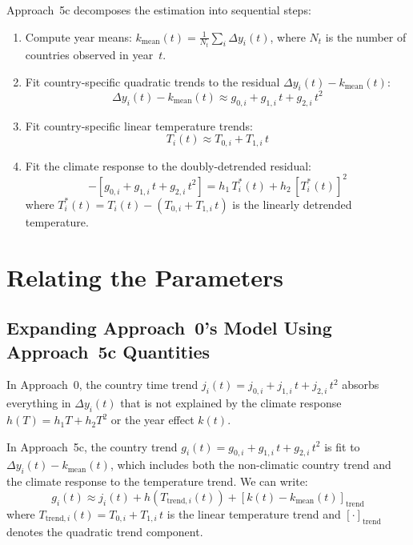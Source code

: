 \documentclass[11pt]{article}
\begin{document}
Approach~5c decomposes the estimation into sequential steps:
\begin{enumerate}
\item Compute year means: $k_{\mathrm{mean}}(t) = \frac{1}{N_t}\sum_i \Delta y_i(t)$,
      where $N_t$ is the number of countries observed in year~$t$.
\item Fit country-specific quadratic trends to the residual $\Delta y_i(t) - k_{\mathrm{mean}}(t)$:
      \begin{equation}
      \Delta y_i(t) - k_{\mathrm{mean}}(t) \approx g_{0,i} + g_{1,i}\,t + g_{2,i}\,t^2
      \label{eq:g_trends}
      \end{equation}
\item Fit country-specific linear temperature trends:
      \begin{equation}
      T_i(t) \approx T_{0,i} + T_{1,i}\,t
      \label{eq:T_trends}
      \end{equation}
\item Fit the climate response to the doubly-detrended residual:
      \begin{equation}
      [\Delta y_i(t) - k_{\mathrm{mean}}(t)] - [g_{0,i} + g_{1,i}\,t + g_{2,i}\,t^2]
      = h_1\,T_i^*(t) + h_2\,[T_i^*(t)]^2
      \label{eq:5c_fit}
      \end{equation}
      where $T_i^*(t) = T_i(t) - (T_{0,i} + T_{1,i}\,t)$ is the linearly detrended temperature.
\end{enumerate}

\section{Relating the Parameters}

\subsection{Expanding Approach~0's Model Using Approach~5c Quantities}

In Approach~0, the country time trend $j_i(t) = j_{0,i} + j_{1,i}\,t + j_{2,i}\,t^2$
absorbs everything in $\Delta y_i(t)$ that is not explained by the climate response
$h(T) = h_1 T + h_2 T^2$ or the year effect $k(t)$.

In Approach~5c, the country trend $g_i(t) = g_{0,i} + g_{1,i}\,t + g_{2,i}\,t^2$
is fit to $\Delta y_i(t) - k_{\mathrm{mean}}(t)$, which includes both the
non-climatic country trend and the climate response to the temperature trend.
We can write:
\begin{equation}
g_i(t) \approx j_i(t) + h(T_{\mathrm{trend},i}(t)) + [k(t) - k_{\mathrm{mean}}(t)]_{\mathrm{trend}}
\end{equation}
where $T_{\mathrm{trend},i}(t) = T_{0,i} + T_{1,i}\,t$ is the linear temperature trend
and $[\cdot]_{\mathrm{trend}}$ denotes the quadratic trend component.
\end{document}
